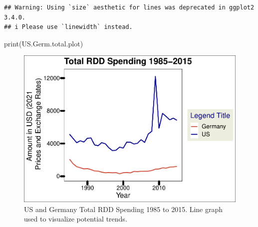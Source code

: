 \documentclass[
  12pt,
]{article}
\newenvironment{Shaded}{\begin{snugshade}}{\end{snugshade}}
\newcommand{\FunctionTok}[1]{\textcolor[rgb]{0.00,0.00,0.00}{#1}}
\newcommand{\NormalTok}[1]{#1}
\begin{document}
\begin{verbatim}
## Warning: Using `size` aesthetic for lines was deprecated in ggplot2 3.4.0.
## i Please use `linewidth` instead.
\end{verbatim}

\begin{Shaded}
\begin{Highlighting}[]
\FunctionTok{print}\NormalTok{(US.Germ.total.plot)}
\end{Highlighting}
\end{Shaded}

\begin{figure}
\centering
\includegraphics{Chang_Jenkins_Mullens_ENV872_Final_files/figure-latex/Germany and US Line Plot for total budget-1.pdf}
\caption{US and Germany Total RDD Spending 1985 to 2015. Line graph used
to visualize potential trends.}
\end{figure}
\end{document}
